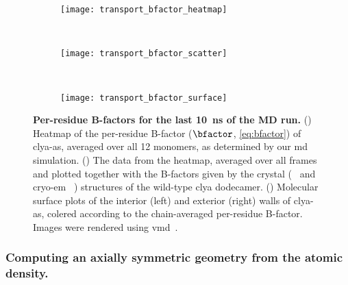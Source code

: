 %
\begin{figure*}[p]
  \centering
  
  \begin{subfigure}[t]{11.5cm}
    \centering
    \caption{}\vspace{0mm}\label{fig:transport_bfactor_heatmap}
    \texttt{[image: transport\_bfactor\_heatmap]}
  \end{subfigure}
  \\
  \begin{subfigure}[t]{11.5cm}
    \centering
    \caption{}\vspace{0mm}\label{fig:transport_bfactor_scatter}
    \texttt{[image: transport\_bfactor\_scatter]}
  \end{subfigure}
  \\
  \begin{subfigure}[t]{11.5cm}
    \centering
    \hspace{-0.5cm}
    \caption{}\vspace{0mm}\label{fig:transport_bfactor_surface}
    \texttt{[image: transport\_bfactor\_surface]}
  \end{subfigure}

  \caption[Per-residue B-factors for the last 10~ns of the MD run.]%
  {%
    \textbf{Per-residue B-factors for the last 10~ns of the MD run.}
    ()
    Heatmap of the per-residue B-factor ($\bfactor$, \cref{eq:bfactor}) of \gls{clya-as}, averaged over all 12
    monomers, as determined by our \gls{md} simulation.
    ()
    The data from the heatmap, averaged over all frames and plotted together with the B-factors given by the
    crystal (~\cite{Mueller-2009} and \gls{cryo-em} ~\cite{Peng-2019}) structures of
    the wild-type \gls{clya} dodecamer.
    ()
    Molecular surface plots of the interior (left) and exterior (right) walls of \gls{clya-as}, colered
    according to the chain-averaged per-residue B-factor. Images were rendered using
    \gls{vmd}~\cite{Humphrey-1996}.
  }\label{fig:transport_bfactor}
\end{figure*}
%

\subsubsection{Computing an axially symmetric geometry from the atomic density.}
%

